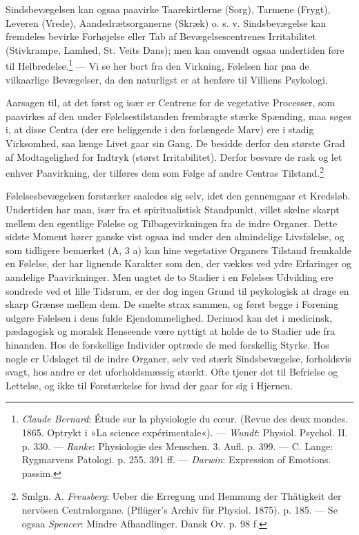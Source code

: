 \documentclass[12pt,a4paper,openany]{book}
\newcommand{\opage}[1]{\marginnote{\footnotesize\textit{[#1]}}}
\begin{document}
Sindsbevægelsen kan ogsaa paavirke Taarekirtlerne (Sorg), Tarmene
(Frygt), Leveren (Vrede), Aandedrætsorganerne (Skræk) o. s. v.
Sindsbevægelse kan fremdeles bevirke Forhøjelse eller Tab af
Bevægelsescentrenes Irritabilitet (Stivkrampe, Lamhed, St. Veits Dans);
men kan omvendt ogsaa undertiden føre til
Helbredelse.\footnote[1]{\emph{Claude Bernard}: Étude sur la physiologie
du cœur. (Revue des deux mondes. 1865. Optrykt i »La science
expérimentale«). --- \emph{Wundt}: Physiol. Psychol. II. p. 330. ---
\emph{Ranke}: Physiologie des Menschen. 3. Aufl. p. 399. --- C. Lange:
Rygmarvens Patologi. p. 255. 391 ff. --- \emph{Darwin}: Expression of
Emotions. passim.} --- Vi se her bort fra den Virkning, Følelsen har paa
de vilkaarlige Bevægelser, da den naturligst er at henføre til Villiens
Psykologi.

Aarsagen til, at det først og især er Centrene for de vegetative
Processer, som paavirkes af den under Følelsestilstanden frembragte
stærke Spænding, maa søges i, at disse Centra (der ere beliggende i den
forlængede Marv) ere i stadig Virksomhed, saa længe Livet gaar sin Gang.
De besidde derfor den største Grad af Modtagelighed for Indtryk (størst
Irritabilitet). Derfor besvare de rask og let enhver Paavirkning, der
tilføres dem som Følge af andre Centras Tilstand.\footnote[2]{Smlgn. A.
\emph{Freusberg}: Ueber die Erregung und Hemmung der Thätigkeit der
nervösen Centralorgane. (Pflüger’s Archiv für Physiol. 1875). p. 185.
--- Se ogsaa \emph{Spencer}: Mindre Afhandlinger. Dansk Ov. p. 98 f.}

Følelsesbevægelsen forstærker saaledes sig selv, idet den gennemgaar et
Kredsløb. Undertiden har man, især fra et spiritualistisk Standpunkt,
villet skelne skarpt mellem den egentlige Følelse og Tilbagevirkningen
fra de indre Organer. Dette sidste Moment hører ganske vist ogsaa ind
under den almindelige Livsfølelse, og som tidligere bemærket (A, 3 a)
kan hine vegetative Organers Tilstand fremkalde en Følelse, der har
lignende Karakter som den, der vækkes ved ydre Erfaringer og aandelige
Paavirkninger. Men uagtet de to Stadier i en Følelses Udvikling ere
sondrede ved et lille Tidsrum, er der
\opage{322}dog ingen Grund til psykologisk at drage en skarp Grænse
mellem dem. De smelte strax sammen, og først begge i Forening udgøre
Følelsen i dens fulde Ejendommelighed. Derimod kan det i medicinsk,
pædagogisk og moralsk Henseende være nyttigt at holde de to Stadier ude
fra hinanden. Hos de forskellige Individer optræde de med forskellig
Styrke. Hos nogle er Udslaget til de indre Organer, selv ved stærk
Sindsbevægelse, forholdsvis svagt, hos andre er det uforholdsmæssig
stærkt. Ofte tjener det til Befrielse og Lettelse, og ikke til
Forstærkelse for hvad der gaar for sig i Hjernen.
\end{document}
